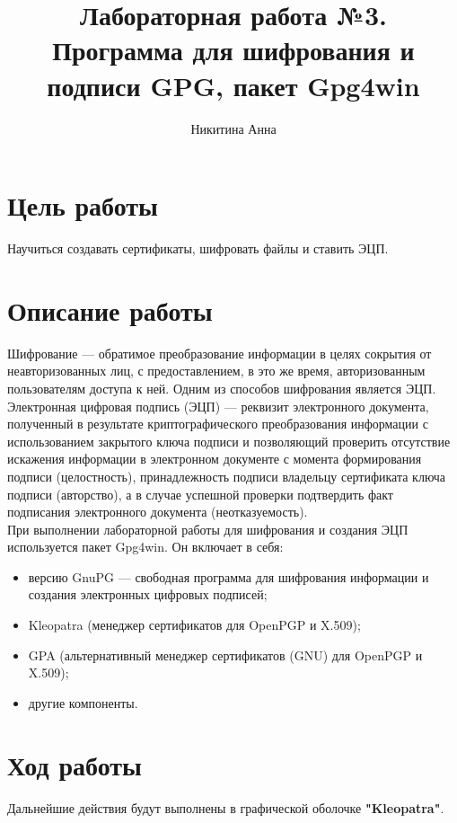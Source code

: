 \documentclass[10pt,a4paper]{report}
\author{Никитина Анна}
\title{Лабораторная работа №3.\\
	Программа для шифрования и подписи GPG, пакет Gpg4win}
\begin{document}
\maketitle
\tableofcontents
\pagebreak

\section{Цель работы}
Научиться создавать сертификаты, шифровать файлы и ставить ЭЦП.
\section{Описание работы}
Шифрование — обратимое преобразование информации в целях сокрытия от неавторизованных лиц, с предоставлением, в это же время, авторизованным пользователям доступа к ней. Одним из способов шифрования является ЭЦП.  \\
Электронная цифровая подпись (ЭЦП) — реквизит электронного документа, полученный в результате криптографического преобразования информации с использованием закрытого ключа подписи и позволяющий проверить отсутствие искажения информации в электронном документе с момента формирования подписи (целостность), принадлежность подписи владельцу сертификата ключа подписи (авторство), а в случае успешной проверки подтвердить факт подписания электронного документа (неотказуемость).  \\
При выполнении лабораторной работы для шифрования и создания ЭЦП используется пакет
Gpg4win. Он включает в себя:
\begin{itemize}
\item версию GnuPG — свободная программа для шифрования информации и создания электронных цифровых подписей;
\item Kleopatra (менеджер сертификатов для OpenPGP и X.509);
\item GPA (альтернативный менеджер сертификатов (GNU) для OpenPGP и X.509);
\item другие компоненты.
\end{itemize}
\pagebreak
\section{Ход работы}
Дальнейшие действия будут выполнены в графической оболочке \textbf{"Kleopatra"}.
\end{document}
